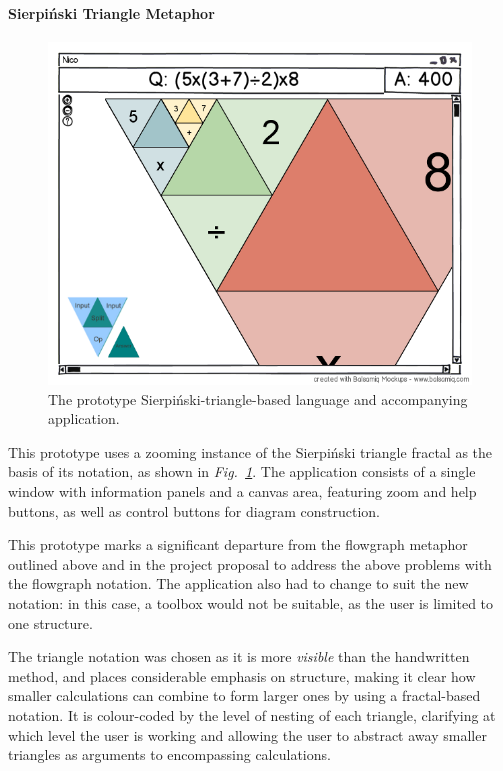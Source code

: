 \documentclass[12pt,twoside,notitlepage,xetex]{report}
\begin{document}
\paragraph{Sierpiński Triangle Metaphor}\hfill

\begin{figure}[H]
\begin{center}
\includegraphics[width=\textwidth]{figs/mockups/sierp/sierp_mockup_full.png}
\caption{The prototype Sierpiński-triangle-based language and accompanying application.}
\label{fig:ProtoTri}
\end{center}
\end{figure}

This prototype uses a zooming instance of the Sierpiński triangle fractal as the basis of its notation, as shown in \emph{Fig.~\ref{fig:ProtoTri}}.  The application consists of a single window with information panels and a canvas area, featuring zoom and help buttons, as well as control buttons for diagram construction.

This prototype marks a significant departure from the flowgraph metaphor outlined above and in the project proposal to address the above problems with the flowgraph notation.  The application also had to change to suit the new notation: in this case, a toolbox would not be suitable, as the user is limited to one structure.

The triangle notation was chosen as it is more \emph{visible} than the handwritten method, and places considerable emphasis on structure, making it clear how smaller calculations can combine to form larger ones by using a fractal-based notation.  It is colour-coded by the level of nesting of each triangle, clarifying at which level the user is working and allowing the user to abstract away smaller triangles as arguments to encompassing calculations.
\end{document}
